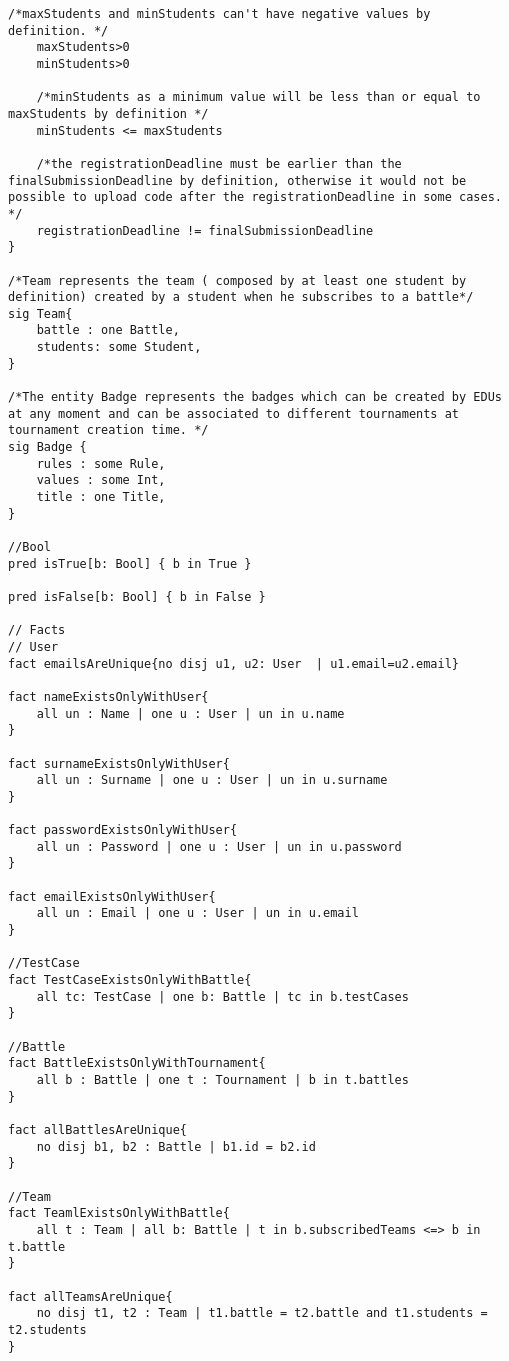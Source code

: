 \begin{lstlisting}[language=Alloy,  label={lst:alloycode}, basicstyle=\fontfamily{Roboto}\selectfont\ttfamily]
    /*maxStudents and minStudents can't have negative values by definition. */
    maxStudents>0
    minStudents>0 
    
    /*minStudents as a minimum value will be less than or equal to maxStudents by definition */
    minStudents <= maxStudents
    
    /*the registrationDeadline must be earlier than the finalSubmissionDeadline by definition, otherwise it would not be possible to upload code after the registrationDeadline in some cases. */
    registrationDeadline != finalSubmissionDeadline 
}

/*Team represents the team ( composed by at least one student by definition) created by a student when he subscribes to a battle*/
sig Team{
    battle : one Battle,
    students: some Student,
}

/*The entity Badge represents the badges which can be created by EDUs at any moment and can be associated to different tournaments at tournament creation time. */
sig Badge {
    rules : some Rule,
    values : some Int,
    title : one Title,
}

//Bool
pred isTrue[b: Bool] { b in True }

pred isFalse[b: Bool] { b in False }
    
// Facts
// User
fact emailsAreUnique{no disj u1, u2: User  | u1.email=u2.email}

fact nameExistsOnlyWithUser{
	all un : Name | one u : User | un in u.name
}

fact surnameExistsOnlyWithUser{
	all un : Surname | one u : User | un in u.surname
}

fact passwordExistsOnlyWithUser{
	all un : Password | one u : User | un in u.password
}

fact emailExistsOnlyWithUser{
	all un : Email | one u : User | un in u.email
}

//TestCase
fact TestCaseExistsOnlyWithBattle{
	all tc: TestCase | one b: Battle | tc in b.testCases
}

//Battle 
fact BattleExistsOnlyWithTournament{
	all b : Battle | one t : Tournament | b in t.battles
}

fact allBattlesAreUnique{
	no disj b1, b2 : Battle | b1.id = b2.id
}
	
//Team
fact TeamlExistsOnlyWithBattle{
	all t : Team | all b: Battle | t in b.subscribedTeams <=> b in t.battle
}

fact allTeamsAreUnique{
	no disj t1, t2 : Team | t1.battle = t2.battle and t1.students = t2.students
}


\end{lstlisting}
